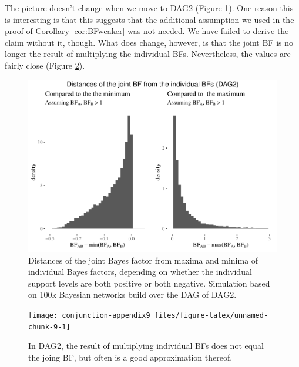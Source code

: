 \documentclass[
  10pt,
  dvipsnames,enabledeprecatedfontcommands]{scrartcl}
\begin{document}
The picture doesn't change when we move to \textsf{DAG2} (Figure
\ref{fig:BFind2}). One reason this is interesting is that this suggests
that the additional assumption we used in the proof of Corollary
\ref{cor:BFweaker} was not needed. We have failed to derive the claim
without it, though. What does change, however, is that the joint BF is
no longer the result of multiplying the individual BFs. Nevertheless,
the values are fairly close (Figure \ref{fig:BFmulti}).

\vspace{1mm}
\footnotesize

\normalsize

\begin{figure}[ht]

\begin{center}\includegraphics[width=1\linewidth]{conjunction-appendix9_files/figure-latex/BFind2-1} \end{center}

\caption{Distances of the joint Bayes factor from maxima and minima of individual Bayes factors, depending on whether the individual support levels are both positive or both negative. Simulation based on 100k Bayesian networks build over the DAG of \textsf{DAG2}.}
\label{fig:BFind2}
\end{figure}

\begin{figure}[ht]

\begin{center}\texttt{[image: conjunction-appendix9\_files/figure-latex/unnamed-chunk-9-1]} \end{center}
\caption{In DAG2, the result of multiplying individual BFs does not equal the joing BF, but often is a good approximation thereof.}
\label{fig:BFmulti}
\end{figure}
\end{document}
